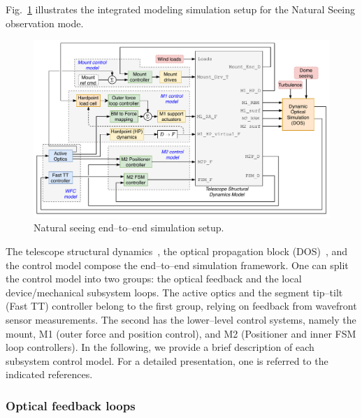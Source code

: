 \documentclass{gmto}
\begin{document}
Fig.~\ref{fig:NS_end2end} illustrates the integrated modeling simulation setup for the Natural Seeing observation mode. %
%
\begin{figure}[!hbt]
    \centering
    \includegraphics[width=\textwidth]{NS_end2end_syslevel.pdf}
    \caption{Natural seeing end--to--end simulation setup.}
    \label{fig:NS_end2end}
\end{figure}
%
 The telescope structural dynamics~\cite{ss2fem_Christoph2020}, the optical propagation block (DOS)~\cite{Conan2017_DOS}, and the control model compose the end--to--end simulation framework. One can split the control model into two groups: the optical feedback and the local device/mechanical subsystem loops. The active optics and the segment tip--tilt (Fast TT) controller belong to the first group, relying on feedback from wavefront sensor measurements. The second has the lower--level control systems, namely the mount, M1 (outer force and position control), and M2 (Positioner and inner FSM loop controllers). In the following, we provide a brief description of each subsystem control model. For a detailed presentation, one is referred to the indicated references.


\subsubsection{Optical feedback loops}
\label{sec:optics-ctrl}
\end{document}
